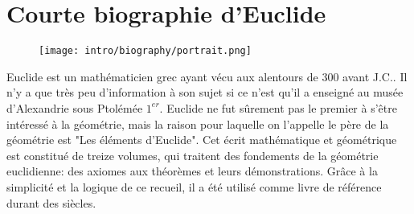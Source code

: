 \documentclass[a4paper,12pt]{article}
\begin{document}
\section{Courte biographie d'Euclide}

\begin{figure}[H]
    \centering
    \texttt{[image: intro/biography/portrait.png]}
\end{figure}
Euclide est un mathématicien grec ayant vécu aux alentours de 300 avant J.C.. Il n'y a que très peu d'information à son sujet si ce n'est qu'il a enseigné au musée d'Alexandrie sous Ptolémée $1^{er}$. Euclide ne fut sûrement pas le premier à s'être intéressé à la géométrie, mais la raison pour laquelle on l'appelle le père de la géométrie est "Les éléments d'Euclide". Cet écrit mathématique et géométrique est constitué de treize volumes, qui traitent des fondements de la géométrie euclidienne: des axiomes aux théorèmes et leurs démonstrations. Grâce à la simplicité et la logique de ce recueil, il a été utilisé comme livre de référence durant des siècles.
\end{document}
